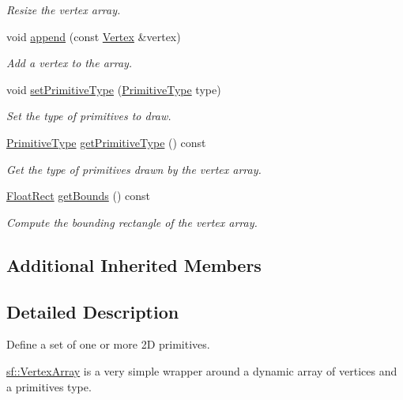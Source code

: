 \begin{DoxyCompactItemize}
\begin{DoxyCompactList}\small\item\em Resize the vertex array. \end{DoxyCompactList}\item 
void \hyperlink{classsf_1_1_vertex_array_a80c8f6865e53bd21fc6cb10fffa10035}{append} (const \hyperlink{classsf_1_1_vertex}{Vertex} \&vertex)
\begin{DoxyCompactList}\small\item\em Add a vertex to the array. \end{DoxyCompactList}\item 
void \hyperlink{classsf_1_1_vertex_array_aa38c10707c28a97f4627ae8b2f3ad969}{set\+Primitive\+Type} (\hyperlink{group__graphics_ga5ee56ac1339984909610713096283b1b}{Primitive\+Type} type)
\begin{DoxyCompactList}\small\item\em Set the type of primitives to draw. \end{DoxyCompactList}\item 
\hyperlink{group__graphics_ga5ee56ac1339984909610713096283b1b}{Primitive\+Type} \hyperlink{classsf_1_1_vertex_array_aa1a60d84543aa6e220683349b645f130}{get\+Primitive\+Type} () const
\begin{DoxyCompactList}\small\item\em Get the type of primitives drawn by the vertex array. \end{DoxyCompactList}\item 
\hyperlink{classsf_1_1_rect}{Float\+Rect} \hyperlink{classsf_1_1_vertex_array_abd57744c732abfc7d4c98d8e1d4ccca1}{get\+Bounds} () const
\begin{DoxyCompactList}\small\item\em Compute the bounding rectangle of the vertex array. \end{DoxyCompactList}\end{DoxyCompactItemize}
\subsection*{Additional Inherited Members}


\subsection{Detailed Description}
Define a set of one or more 2D primitives. 

\hyperlink{classsf_1_1_vertex_array}{sf\+::\+Vertex\+Array} is a very simple wrapper around a dynamic array of vertices and a primitives type.

